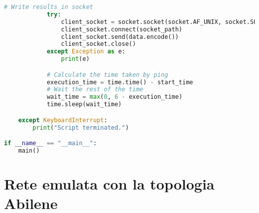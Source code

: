 \begin{lstlisting}[language=Python]
            # Write results in socket
            try:
                client_socket = socket.socket(socket.AF_UNIX, socket.SOCK_STREAM)
                client_socket.connect(socket_path)
                client_socket.send(data.encode())
                client_socket.close()
            except Exception as e:
                print(e)

            # Calculate the time taken by ping
            execution_time = time.time() - start_time
            # Wait the rest of the time
            wait_time = max(0, 6 - execution_time)
            time.sleep(wait_time)

    except KeyboardInterrupt:
        print("Script terminated.")

if __name__ == "__main__":
    main()
\end{lstlisting}
\section{Rete emulata con la topologia Abilene}
\label{cap:ab}
